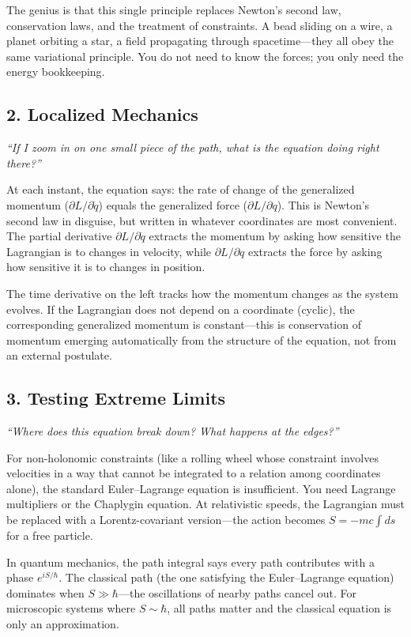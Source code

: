 The genius is that this single principle replaces Newton's second law, conservation laws, and the treatment of constraints. A bead sliding on a wire, a planet orbiting a star, a field propagating through spacetime---they all obey the same variational principle. You do not need to know the forces; you only need the energy bookkeeping.

\subsection*{2. Localized Mechanics}
\textit{``If I zoom in on one small piece of the path, what is the equation doing right there?''}

At each instant, the equation says: the rate of change of the generalized momentum ($\partial L / \partial \dot{q}$) equals the generalized force ($\partial L / \partial q$). This is Newton's second law in disguise, but written in whatever coordinates are most convenient. The partial derivative $\partial L / \partial \dot{q}$ extracts the momentum by asking how sensitive the Lagrangian is to changes in velocity, while $\partial L / \partial q$ extracts the force by asking how sensitive it is to changes in position.

The time derivative on the left tracks how the momentum changes as the system evolves. If the Lagrangian does not depend on a coordinate (cyclic), the corresponding generalized momentum is constant---this is conservation of momentum emerging automatically from the structure of the equation, not from an external postulate.

\subsection*{3. Testing Extreme Limits}
\textit{``Where does this equation break down? What happens at the edges?''}

For non-holonomic constraints (like a rolling wheel whose constraint involves velocities in a way that cannot be integrated to a relation among coordinates alone), the standard Euler--Lagrange equation is insufficient. You need Lagrange multipliers or the Chaplygin equation. At relativistic speeds, the Lagrangian must be replaced with a Lorentz-covariant version---the action becomes $S = -mc \int ds$ for a free particle.

In quantum mechanics, the path integral says every path contributes with a phase $e^{iS/\hbar}$. The classical path (the one satisfying the Euler--Lagrange equation) dominates when $S \gg \hbar$---the oscillations of nearby paths cancel out. For microscopic systems where $S \sim \hbar$, all paths matter and the classical equation is only an approximation.

